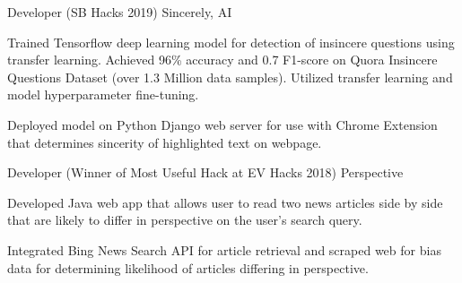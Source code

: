 

\begin{cventries}

  \cventry
    {Developer (SB Hacks 2019)} %
    {Sincerely, AI} %
    {} %
    {} %
    {
      \begin{cvitems} %
        \item {Trained Tensorflow deep learning model for detection of insincere questions using 
        transfer learning. Achieved 96\% accuracy and 0.7 F1-score on Quora Insincere 
        Questions Dataset (over 1.3 Million data samples). Utilized transfer learning and model hyperparameter fine-tuning.}
        \item {Deployed model on Python Django web server for use with Chrome Extension that determines
        sincerity of highlighted text on webpage.}
      \end{cvitems}
    }

  \cventry
    {Developer (Winner of Most Useful Hack at EV Hacks 2018)} %
    {Perspective} %
    {} %
    {} %
    {
      \begin{cvitems} %
        \item {Developed Java web app that allows user to read two news articles side by side 
        that are likely to differ in perspective on the user's search query. }
        \item{Integrated Bing News Search API for article retrieval and scraped web for bias data for determining likelihood of articles differing in perspective.}
      \end{cvitems}
    }

\end{cventries}

